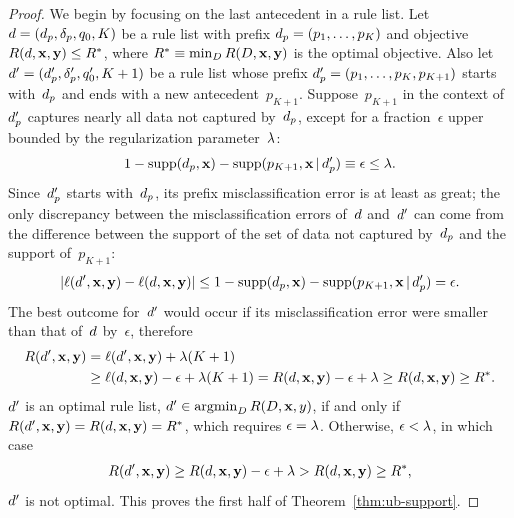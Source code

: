 \begin{proof}
We begin by focusing on the last antecedent in a rule list.
%
Let ${{d} = (d_p, \delta_p, q_0, K)}$
be a rule list with prefix ${d_p = (p_1, \dots, p_K)}$
and objective ${R({d}, \mathbf{x}, \mathbf{y}) \le R^*}$, where
${R^* \equiv \min_{{D}} R({D}, \mathbf{x}, \mathbf{y})}$
is the optimal objective.
%
Also let ${{d}' = (d_p', \delta_p', q_0', K + 1)}$
be a rule list whose prefix ${d_p' = (p_1, \dots, p_K, p_{K+1})}$
starts with~$d_p$ and ends with a new antecedent~$p_{K+1}$.
%
Suppose~$p_{K+1}$ in the context of~$d_p'$ captures nearly all
data not captured by~$d_p$, except for a fraction~$\epsilon$
upper bounded by the regularization parameter~${\lambda}$:
\begin{align}
1 - \Supp(\Prefix, \x) - \Supp(p_{K+1}, \x \given \Prefix') \equiv \epsilon \le \Reg.
\end{align}
%
Since~$d_p'$ starts with~$d_p$,
its prefix misclassification error is at least as great;
the only discrepancy between the misclassification errors
of~${d}$ and~${d}'$ can come from the difference between the support of
the set of data not captured by~$d_p$ and the support of~$p_{K+1}$:
\begin{align}
| \Loss(\RL', \x, \y) - \Loss(\RL, \x, \y) | \le
1 - \Supp(\Prefix, \x) - \Supp(p_{K+1}, \x \given \Prefix') = \epsilon.
\end{align}
The best outcome for~${d}'$ would occur if its misclassification
error were smaller than that of~${d}$ by~$\epsilon$,
%
therefore
\begin{align}
\Obj(\RL', \x, \y) &= \Loss(\RL', \x, \y) + \Reg (K+1) \nn \\
&\ge \Loss(\RL, \x, \y) - \epsilon + \Reg(K+1)
= \Obj(\RL, \x, \y) - \epsilon + \Reg \ge \Obj(\RL, \x, \y) \ge \OptimalObj.
\end{align}
${d}'$ is an optimal rule list,
\ie ${{d}' \in \operatorname*{argmin}_{{D}} R({D}, \mathbf{x}, y)}$,
if and only if ${R({d}', \mathbf{x}, \mathbf{y}) = R({d}, \mathbf{x}, \mathbf{y}) = R^*}$,
which requires ${\epsilon = {\lambda}}$.
%
Otherwise, ${\epsilon < {\lambda}}$, in which case
\begin{align}
\Obj(\RL', \x, \y) \ge \Obj(\RL, \x, \y) - \epsilon + \Reg
> \Obj(\RL, \x, \y) \ge \OptimalObj,
\end{align}
\ie ${d}'$ is not optimal.
%
This proves the first half of Theorem~\ref{thm:ub-support}.


\end{proof}
